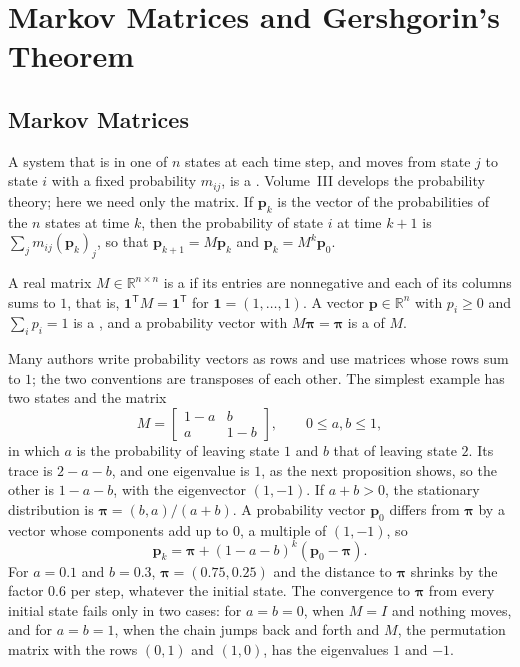 \section{Markov Matrices and Gershgorin's Theorem}
\label{sec:markov}

\subsection{Markov Matrices}

A system that is in one of $n$ states at each time step, and moves from state $j$ to state $i$ with a fixed probability $m_{ij}$, is a . Volume~III develops the probability theory; here we need only the matrix. If $\mathbf p_k$ is the vector of the probabilities of the $n$ states at time $k$, then the probability of state $i$ at time $k+1$ is $\sum_jm_{ij}(\mathbf p_k)_j$, so that $\mathbf p_{k+1}=M\mathbf p_k$ and $\mathbf p_k=M^k\mathbf p_0$.

\begin{definition}
\label{def:markov}
A real matrix $M\in\mathbb R^{n\times n}$ is a  if its entries are nonnegative and each of its columns sums to $1$, that is, $\mathbf 1^{\mathsf T}M=\mathbf 1^{\mathsf T}$ for $\mathbf 1=(1,\ldots,1)$. A vector $\mathbf p\in\mathbb R^n$ with $p_i\ge0$ and $\sum_ip_i=1$ is a , and a probability vector with $M\boldsymbol\pi=\boldsymbol\pi$ is a  of $M$.
\end{definition}

Many authors write probability vectors as rows and use matrices whose rows sum to $1$; the two conventions are transposes of each other. The simplest example has two states and the matrix
\[
M=\begin{bmatrix}1-a&b\\a&1-b\end{bmatrix},\qquad0\le a,b\le1 ,
\]
in which $a$ is the probability of leaving state $1$ and $b$ that of leaving state $2$. Its trace is $2-a-b$, and one eigenvalue is $1$, as the next proposition shows, so the other is $1-a-b$, with the eigenvector $(1,-1)$. If $a+b>0$, the stationary distribution is $\boldsymbol\pi=(b,a)/(a+b)$. A probability vector $\mathbf p_0$ differs from $\boldsymbol\pi$ by a vector whose components add up to $0$, a multiple of $(1,-1)$, so
\[
\mathbf p_k=\boldsymbol\pi+(1-a-b)^k(\mathbf p_0-\boldsymbol\pi).
\]
For $a=0.1$ and $b=0.3$, $\boldsymbol\pi=(0.75,0.25)$ and the distance to $\boldsymbol\pi$ shrinks by the factor $0.6$ per step, whatever the initial state. The convergence to $\boldsymbol\pi$ from every initial state fails only in two cases: for $a=b=0$, when $M=I$ and nothing moves, and for $a=b=1$, when the chain jumps back and forth and $M$, the permutation matrix with the rows $(0,1)$ and $(1,0)$, has the eigenvalues $1$ and $-1$.

